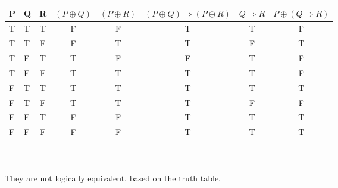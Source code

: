 \documentclass[12pt]{article}
\begin{document}
\begin{enumerate}
	    \begin{tabular}{l|l|c|c|c|c|c|c}
		\hline
		P & Q & R & $(P \oplus Q)$ & $(P\oplus R)$ &$ (P \oplus Q) \Rightarrow (P \oplus R)$ & $Q\Rightarrow R$ & $P \oplus (Q \Rightarrow R)$\\
		\hline
		T & T & T & F      & F     & T & T & F \\
		T & T & F & F      & T     & T & F & T \\
		T & F & T & T      & F     & F & T & F \\
		T & F & F & T      & T     & T & T & F \\
		F & T & T & T      & T     & T & T & T \\
		F & T & F & T      & T     & T & F & F \\
		F & F & T & F      & F     & T & T & T \\
		F & F & F & F      & F     & T & T & T \\
		\hline
	    \end{tabular}\\\\
	    They are not logically equivalent, based on the truth table.
\end{enumerate}
\end{document}
